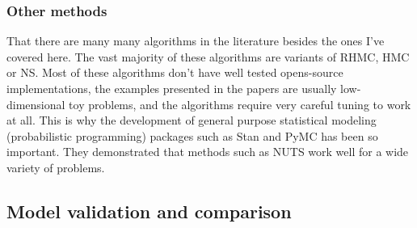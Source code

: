 \documentclass[12pt,dvipsnames]{report}
\begin{document}
\subsubsection{Other methods}
That there are many many algorithms in the  literature besides the ones I've covered here. 
The vast majority of these  algorithms are variants of RHMC, HMC or  
NS. Most of these algorithms don't have well tested opens-source implementations, 
the examples presented in the papers are usually low-dimensional toy 
problems, and the algorithms require very careful tuning to work at all. This 
is why the development of general purpose statistical modeling 
(probabilistic programming) packages such as \textsf{Stan} and 
\textsf{PyMC} has been so important. They demonstrated that methods such as 
NUTS work well for a wide variety of problems.

\subsection{Model validation and comparison}
\label{ssec:model_comparison}
\end{document}
